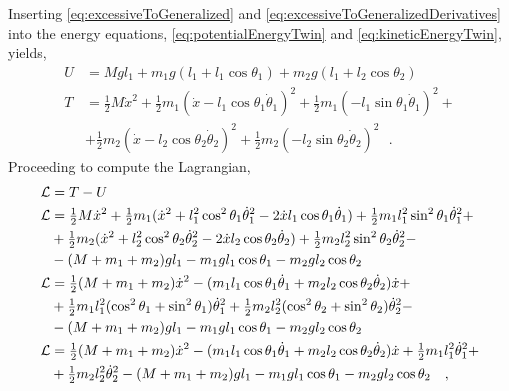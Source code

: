 Inserting \autoref{eq:excessiveToGeneralized} and \ref{eq:excessiveToGeneralizedDerivatives} into the energy equations, \autoref{eq:potentialEnergyTwin} and \ref{eq:kineticEnergyTwin}, yields,
%
\begin{align}
  U &= M g l_1 + m_1 g (l_1 + l_1 \cos \theta_1) + m_2 g (l_1 + l_2 \cos \theta_2)  \label{eq:potentialEnergyTwinGeneralized}  \\
  T &= \tfrac{1}{2} M \dot{x}^2 + \tfrac{1}{2} m_1 (\dot{x} - l_1 \cos \theta_1 \dot{\theta}_1)^2  + \tfrac{1}{2} m_1 (-l_1 \sin \theta_1 \dot{\theta}_1)^2 + \nonumber \\
    &+ \tfrac{1}{2} m_2 (\dot{x} - l_2 \cos \theta_2 \dot{\theta}_2)^2 + \tfrac{1}{2} m_2 (-l_2 \sin \theta_2 \dot{\theta}_2)^2 \label{eq:kineticEnergyTwinGeneralized} \ \ \ .
\end{align}
%
Proceeding to compute the Lagrangian,
\begin{align}
  \cal{L} &= T - U   \\ 
  \cal{L} &= \tfrac{1}{2} M \dot{x}^2 + \tfrac{1}{2} m_1 ( \dot{x}^2 + l_1^2 \cos ^2 \theta_1 \dot{\theta}_1^2 - 2 \dot{x} l_1 \cos \theta_1 \dot{\theta}_1 ) + \tfrac{1}{2} m_1 l_1^2 \sin ^2 \theta_1 \dot{\theta}_1^2 + \nonumber \\
          &+ \tfrac{1}{2} m_2 ( \dot{x}^2 + l_2^2 \cos ^2 \theta_2 \dot{\theta}_2^2 - 2 \dot{x} l_2 \cos \theta_2 \dot{\theta}_2 ) + \tfrac{1}{2} m_2 l_2^2 \sin ^2 \theta_2 \dot{\theta}_2^2 - \nonumber \\
          &-(M + m_1 + m_2) g l_1 - m_1 g l_1 \cos \theta_1 - m_2 g l_2 \cos \theta_2 \\
  \cal{L} &= \tfrac{1}{2} (M + m_1 + m_2) \dot{x}^2 - ( m_1 l_1 \cos \theta_1 \dot{\theta}_1 + m_2 l_2 \cos \theta_2 \dot{\theta}_2 ) \dot{x} + \nonumber \\
          &+ \tfrac{1}{2} m_1 l_1^2 (\cos^2 \theta_1 + \sin^2 \theta_1)\dot{\theta}_1^2 + \tfrac{1}{2} m_2 l_2^2 (\cos^2 \theta_2 + \sin^2 \theta_2)\dot{\theta}_2^2 - \nonumber \\
          &- (M + m_1 + m_2)g l_1 - m_1 g l_1 \cos \theta_1 - m_2 g l_2 \cos \theta_2  \\
  \cal{L} &= \tfrac{1}{2} (M + m_1 + m_2) \dot{x}^2 - ( m_1 l_1 \cos \theta_1 \dot{\theta}_1 + m_2 l_2 \cos \theta_2 \dot{\theta}_2 ) \dot{x} + \tfrac{1}{2} m_1 l_1^2 \dot{\theta}_1^2 + \nonumber \\
          &+ \tfrac{1}{2} m_2 l_2^2 \dot{\theta}_2^2 - (M + m_1 + m_2)g l_1 - m_1 g l_1 \cos \theta_1 - m_2 g l_2 \cos \theta_2
  \ \ \ , 
  \label{eq:lagrangian}
\end{align}
